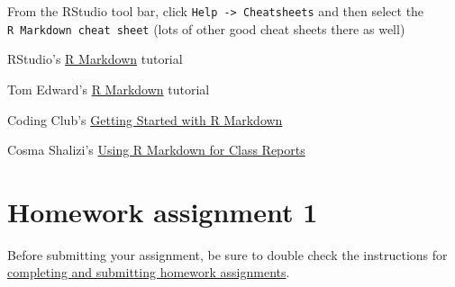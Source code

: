 \documentclass[]{article}
\begin{document}
From the RStudio tool bar, click
\texttt{Help\ -\textgreater{}\ Cheatsheets} and then select the
\texttt{R\ Markdown\ cheat\ sheet} (lots of other good cheat sheets
there as well)

RStudio's \href{https://rmarkdown.rstudio.com/lesson-1.html}{R Markdown}
tutorial

Tom Edward's \href{http://learnr.usu.edu/r_markdown/1_1_markdown.php}{R
Markdown} tutorial

Coding Club's
\href{https://ourcodingclub.github.io/2016/11/24/rmarkdown-1.html}{Getting
Started with R Markdown}

Cosma Shalizi's \href{http://www.stat.cmu.edu/~cshalizi/rmarkdown}{Using
R Markdown for Class Reports}

\hypertarget{homework-assignment-1}{%
\section{Homework assignment 1}\label{homework-assignment-1}}

Before submitting your assignment, be sure to double check the
instructions for
\href{https://rushinglab.github.io/WILD3810/articles/homework.html}{completing
and submitting homework assignments}.
\end{document}
